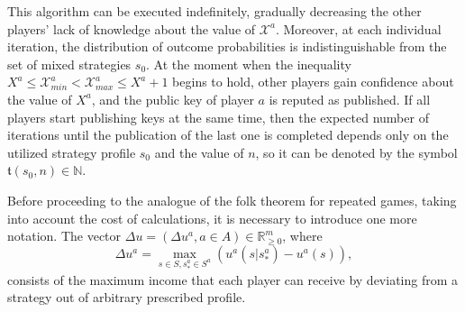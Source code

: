 This algorithm can be executed indefinitely, gradually decreasing the other players' lack of knowledge about the value of $\mathcal{X}^a$. Moreover, at each individual iteration, the distribution of outcome probabilities is indistinguishable from the set of mixed strategies $s_0$. At the moment when the inequality $X^a \le \mathcal{X}^a_{min} < \mathcal{X}^a_{max} \le X^a + 1$ begins to hold, other players gain confidence about the value of $X^a$, and the public key of player $a$ is reputed as published. If all players start publishing keys at the same time, then the expected number of iterations until the publication of the last one is completed depends only on the utilized strategy profile $s_0$ and the value of $n$, so it can be denoted by the symbol $\mathfrak{t}(s_0, n) \in \mathbb{N}$. %

Before proceeding to the analogue of the folk theorem for repeated games, taking into account the cost of calculations, it is necessary to introduce one more notation. The vector $\Delta u = (\Delta u^a, a \in A) \in \mathbb{R}_{\ge 0}^m$, where %
\begin{equation*}
	\Delta u^a = \max_{s \in S, s^a_* \in S^a} (u^a(s | s^a_*) - u^a(s)),
\end{equation*}
consists of the maximum income that each player can receive by deviating from a strategy out of arbitrary prescribed profile. %

